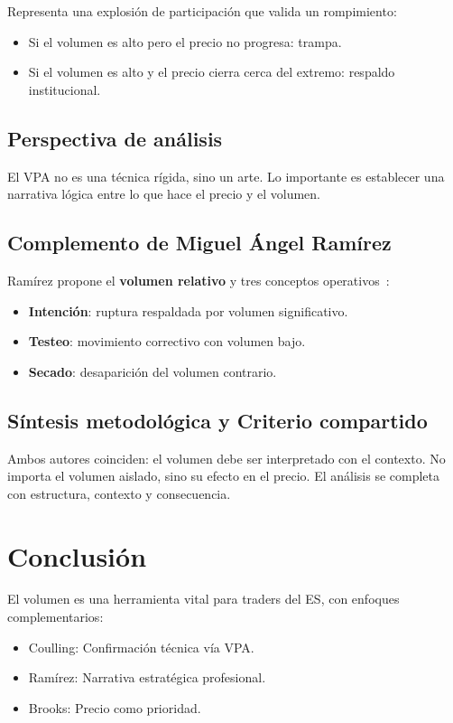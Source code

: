 Representa una explosi\'on de participaci\'on que valida un rompimiento:
\begin{itemize}
  \item Si el volumen es alto pero el precio no progresa: trampa.
  \item Si el volumen es alto y el precio cierra cerca del extremo: respaldo institucional.
\end{itemize}

\subsection{Perspectiva de an\'alisis}

El VPA no es una t\'ecnica r\'igida, sino un arte. Lo importante es establecer una narrativa l\'ogica entre lo que hace el precio y el volumen.

\subsection{Complemento de Miguel \'Angel Ram\'irez}

Ram\'irez propone el \textbf{volumen relativo} y tres conceptos operativos~\cite{ramirez18}:
\begin{itemize}
  \item \textbf{Intenci\'on}: ruptura respaldada por volumen significativo.
  \item \textbf{Testeo}: movimiento correctivo con volumen bajo.
  \item \textbf{Secado}: desaparici\'on del volumen contrario.
\end{itemize}

\subsection{S\'intesis metodol\'ogica y Criterio compartido}

Ambos autores coinciden: el volumen debe ser interpretado con el contexto. No importa el volumen aislado, sino su efecto en el precio. El an\'alisis se completa con estructura, contexto y consecuencia.

\section{Conclusi\'on}

El volumen es una herramienta vital para traders del ES, con enfoques complementarios:
\begin{itemize}
    \item Coulling: Confirmaci\'on t\'ecnica v\'ia VPA.
    \item Ram\'irez: Narrativa estrat\'egica profesional.
    \item Brooks: Precio como prioridad.
\end{itemize}

